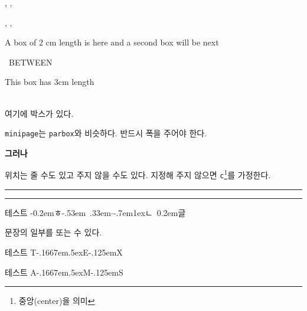 \documentclass[10pt]{article}
\newcommand{\hangl}{\lower-0.2em\hbox{{ㅎ\kern-.53em\lower%
.33em\hbox{$\cdot$}\kern -.7em\lower 1ex\hbox{ㄴ}}%
\lower0.2em\hbox{글}}}
\def\TeX{T\kern-.1667em\lower.5ex\hbox{E}\kern-.125emX}
\def\AmS{{\protect\usefont{OMS}{cmsy}{m}{n}A\kern-.1667em\lower.5ex\hbox{M}\kern-.125emS}}
\begin{document}


, , 

, , 

\parbox{2in}{A box of 2 cm length is here
and a second box will be next} \ \hfill BETWEEN \ \hfill
\parbox{3cm}{This box has 3cm length} \\ 

여기에 \hfill {} \hfill 박스가 있다. \\

\begin{minipage}[t]{2in}
\texttt{minipage}는 \texttt{parbox}와 비슷하다.
반드시 폭을 주어야 한다.
\end{minipage} 
\textbf{그러나} \ 
\begin{minipage}[b]{2in}
위치는 줄 수도 있고 주지 않을 수도 있다. 지정해 주지 않으면 \texttt{c}\footnote{중앙(center)을 의미}를 가정한다.
\end{minipage}


\addtolength{\marginparwidth}{-1cm}
\reversemarginpar
{}

\normalmarginpar
\addtolength{\marginparwidth}{1cm}

\rule{3mm}{3mm} \rule[2mm]{3mm}{3mm}

\fbox{\rule{1cm}{0cm} \rule{0cm}{1cm}}

테스트 \hangl

 문장의 일부를 \raisebox{.6ex}{올리거나} 또는 \raisebox{-.6ex}{내릴} 수 있다.

테스트 \TeX

테스트 \AmS
\end{document}

